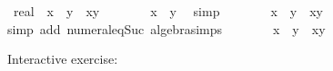 \begin{isabellebody}
%
\endisadelimproof
%
\isatagproof
{}\isamarkupfalse%
%
\endisatagproof
{\isafoldproof}%
%
\isadelimproof
%
\endisadelimproof
%
\isadelimdocument
%
\endisadelimdocument
%
\isatagdocument
%
\isamarkuptrue%
%
\endisatagdocument
{\isafolddocument}%
%
\isadelimdocument
%
\endisadelimdocument
{}\isamarkupfalse%
\ {\isachardoublequoteopen}{\isacharparenleft}{\kern0pt}{}{\isacharcolon}{\kern0pt}{\isacharcolon}{\kern0pt}real{\isacharparenright}{\kern0pt}\ {\isasymle}\ x{\isacharcircum}{\kern0pt}{}\ {\isacharplus}{\kern0pt}\ y{\isacharcircum}{\kern0pt}{}\ {\isacharminus}{\kern0pt}\ {}{\isacharasterisk}{\kern0pt}x{\isacharasterisk}{\kern0pt}y{\isachardoublequoteclose}\isanewline
%
\isadelimproof
%
\endisadelimproof
%
\isatagproof
{}\isamarkupfalse%
\ {\isacharminus}{\kern0pt}\isanewline
\ \ \isamarkupfalse%
\ {\isachardoublequoteopen}{}\ {\isasymle}\ {\isacharparenleft}{\kern0pt}x\ {\isacharminus}{\kern0pt}\ y{\isacharparenright}{\kern0pt}{\isacharcircum}{\kern0pt}{}{\isachardoublequoteclose}\ \isamarkupfalse%
\ simp\isanewline
\ \ \isamarkupfalse%
\ \isamarkupfalse%
\ {\isachardoublequoteopen}{\isasymdots}\ {\isacharequal}{\kern0pt}\ x{\isacharcircum}{\kern0pt}{}\ {\isacharplus}{\kern0pt}\ y{\isacharcircum}{\kern0pt}{}\ {\isacharminus}{\kern0pt}\ {}{\isacharasterisk}{\kern0pt}x{\isacharasterisk}{\kern0pt}y{\isachardoublequoteclose}\isanewline
\ \ \ \ \isamarkupfalse%
{\isacharparenleft}{\kern0pt}simp\ add{\isacharcolon}{\kern0pt}\ numeral{\isacharunderscore}{\kern0pt}eq{\isacharunderscore}{\kern0pt}Suc\ algebra{\isacharunderscore}{\kern0pt}simps{\isacharparenright}{\kern0pt}\isanewline
\ \ \isamarkupfalse%
\ \isamarkupfalse%
\ {\isachardoublequoteopen}{}\ {\isasymle}\ x{\isacharcircum}{\kern0pt}{}\ {\isacharplus}{\kern0pt}\ y{\isacharcircum}{\kern0pt}{}\ {\isacharminus}{\kern0pt}\ {}{\isacharasterisk}{\kern0pt}x{\isacharasterisk}{\kern0pt}y{\isachardoublequoteclose}\ \isacommand{{\isachardot}{\kern0pt}}\isamarkupfalse%
\isanewline
{}\isamarkupfalse%
%
\endisatagproof
{\isafoldproof}%
%
\isadelimproof
%
\endisadelimproof
%
\begin{isamarkuptext}%
Interactive exercise:%
\end{isamarkuptext}\isamarkuptrue%
\isamarkupfalse%

\end{isabellebody}
